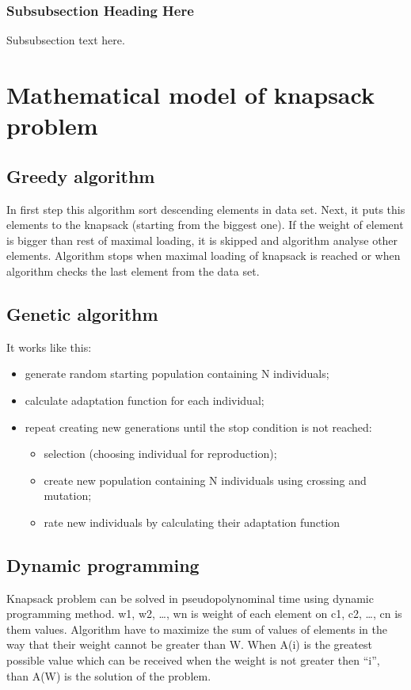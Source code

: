 \documentclass[conference,compsoc]{IEEEtran}
\begin{document}
\subsubsection{Subsubsection Heading Here}
Subsubsection text here.


\section{Mathematical model of knapsack problem}
\subsection{Greedy algorithm}
In first step this algorithm sort descending elements in data set. Next, it puts this elements to the knapsack (starting from the biggest one). If the weight of element is bigger than rest of maximal loading, it is skipped and algorithm analyse other elements. Algorithm stops when maximal loading of knapsack is reached or when algorithm checks the last element from the data set.

\subsection{Genetic algorithm}
It works like this:
\begin{itemize}
\item generate random starting population containing N individuals;
\item calculate adaptation function for each individual;
\item repeat creating new generations until the stop condition is not reached:
	\begin{itemize}
	\item selection (choosing individual for reproduction);
	\item create new population containing N individuals 					using crossing and mutation;
	\item rate new individuals by calculating their 						adaptation function
	\end{itemize}
	

\end{itemize}
\subsection{Dynamic programming}
Knapsack problem can be solved in pseudopolynominal time using dynamic programming method. w1, w2, …, wn is weight of each element on c1, c2, …, cn is them values. Algorithm have to maximize the sum of values of elements in the way that their weight cannot be greater than W. When A(i) is the greatest possible value which can be received when the weight is not greater then “i”, than A(W) is the solution of the problem.
\end{document}
